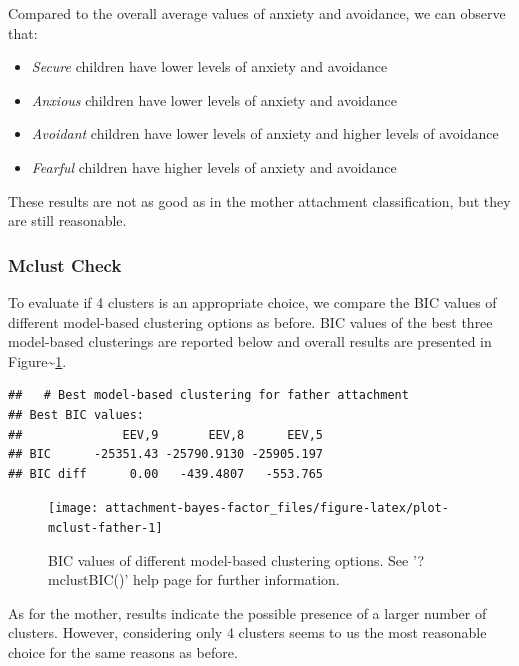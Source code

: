 \documentclass[
]{book}
\providecommand{\tightlist}{%
  \setlength{\itemsep}{0pt}\setlength{\parskip}{0pt}}
\begin{document}
Compared to the overall average values of anxiety and avoidance, we can observe that:

\begin{itemize}
\tightlist
\item
  \emph{Secure} children have lower levels of anxiety and avoidance
\item
  \emph{Anxious} children have lower levels of anxiety and avoidance
\item
  \emph{Avoidant} children have lower levels of anxiety and higher levels of avoidance
\item
  \emph{Fearful} children have higher levels of anxiety and avoidance
\end{itemize}

These results are not as good as in the mother attachment classification, but they are still reasonable.

\hypertarget{mclust-check-1}{%
\subsubsection*{Mclust Check}\label{mclust-check-1}}

To evaluate if 4 clusters is an appropriate choice, we compare the BIC values of different model-based clustering options as before. BIC values of the best three model-based clusterings are reported below and overall results are presented in Figure\textasciitilde\ref{fig:plot-mclust-father}.

\begin{verbatim}
##   # Best model-based clustering for father attachment
## Best BIC values:
##              EEV,9       EEV,8      EEV,5
## BIC      -25351.43 -25790.9130 -25905.197
## BIC diff      0.00   -439.4807   -553.765
\end{verbatim}

\begin{figure}

{\centering \texttt{[image: attachment-bayes-factor\_files/figure-latex/plot-mclust-father-1]} 

}

\caption{BIC values of different model-based clustering options. See '?mclustBIC()' help page for further information.}\label{fig:plot-mclust-father}
\end{figure}

As for the mother, results indicate the possible presence of a larger number of clusters. However, considering only 4 clusters seems to us the most reasonable choice for the same reasons as before.
\end{document}

